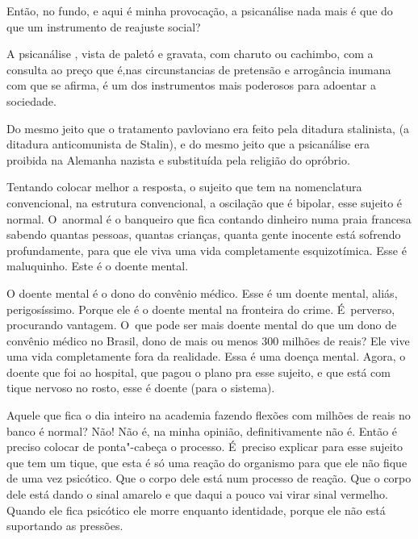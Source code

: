  

Então, no fundo, e aqui é minha provocação, a psicanálise nada mais é
que do que um instrumento de reajuste social?

 

A psicanálise , vista de paletó e gravata, com charuto ou cachimbo, com
a consulta ao preço que é,nas circunstancias de pretensão e arrogância
inumana com que se afirma, é um dos instrumentos mais poderosos para
adoentar a sociedade.

 

Do mesmo jeito que o tratamento pavloviano era feito pela ditadura
stalinista, (a ditadura anticomunista de Stalin), e do mesmo jeito que a
psicanálise era proibida na Alemanha nazista e substituída pela religião
do opróbrio.

 

Tentando colocar melhor a resposta, o sujeito que tem na nomenclatura
convencional, na estrutura convencional, a oscilação que é bipolar, esse
sujeito é normal. O~anormal é o banqueiro que fica contando dinheiro
numa praia francesa sabendo quantas pessoas, quantas crianças, quanta
gente inocente está sofrendo profundamente, para que ele viva uma vida
completamente esquizotímica. Esse é maluquinho. Este é o doente mental.

 

O doente mental é o dono do convênio médico. Esse é um doente mental,
aliás, perigosíssimo. Porque ele é o doente mental na fronteira do
crime. É~perverso, procurando vantagem. O~que pode ser mais doente
mental do que um dono de convênio médico no Brasil, dono de mais ou
menos 300 milhões de reais? Ele vive uma vida completamente fora da
realidade. Essa é uma doença mental. Agora, o doente que foi ao
hospital, que pagou o plano pra esse sujeito, e que está com tique
nervoso no rosto, esse é doente (para o sistema).

 

Aquele que fica o dia inteiro na academia fazendo flexões com milhões de
reais no banco é normal? Não! Não é, na minha opinião, definitivamente
não é. Então é preciso colocar de ponta"-cabeça o processo. É~preciso
explicar para esse sujeito que tem um tique, que esta é só uma reação do
organismo para que ele não fique de uma vez psicótico. Que o corpo dele
está num processo de reação. Que o corpo dele está dando o sinal amarelo
e que daqui a pouco vai virar sinal vermelho. Quando ele fica psicótico
ele morre enquanto identidade, porque ele não está suportando as
pressões.


